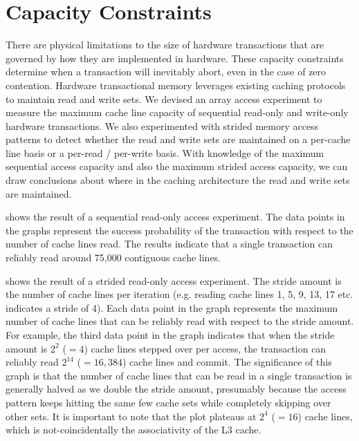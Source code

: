 \section{Capacity Constraints}
\label{sec:capacity}
There are physical limitations to the size of hardware 
transactions that are
governed by how they are implemented in hardware. 
These capacity constraints
determine when a transaction will inevitably abort, 
even in the case of zero contention. 
Hardware transactional memory leverages existing caching 
protocols to maintain read and write sets. We 
devised an array access
experiment to measure the maximum cache line capacity 
of sequential read-only and write-only
hardware transactions. We also experimented with strided 
memory access patterns
to detect whether the read and write sets are maintained
on a per-cache line basis or a per-read / per-write basis.
With knowledge of the maximum sequential access 
capacity and also the maximum
strided access capacity, we can draw conclusions 
about where in the caching
architecture the read and write sets are 
maintained. 


 shows the result of a sequential
read-only access experiment. The data points in the graphs represent the success
probability of the transaction with respect to the number of cache lines read.
The results indicate that a single transaction can reliably read 
around 75,000 contiguous cache lines.

 shows the result of a strided read-only
access experiment. The stride amount is the number of cache lines per
iteration (e.g. reading cache lines 1, 5, 9, 13, 17 etc. 
indicates a stride of 4). Each data point in the graph 
represents the maximum number of cache
lines that can be reliably read with respect 
to the stride amount. For example,
the third data point in the graph indicates 
that when the stride amount is
$2^2$ ($=4$) cache lines stepped over per access, 
the transaction can reliably read
$2^{14}$ ($=16,384$) cache lines and commit. 
The significance of this graph is that
the number of cache lines that can be read in a 
single transaction is generally
halved as we double the stride amount, presumably 
because the access pattern
keeps hitting the same few cache sets while 
completely skipping over other sets.
It is important to note that the plot plateaus 
at $2^4$ ($=16$) cache lines, which is not-coincidentally
the associativity of the L3 cache.

